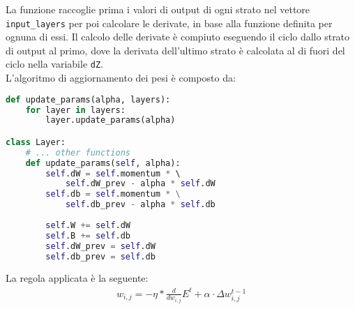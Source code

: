 La funzione raccoglie prima i valori di output di ogni strato nel vettore \texttt{input\_layers} per poi calcolare le derivate, in base alla funzione definita per ognuna di essi. Il calcolo delle derivate è compiuto eseguendo il ciclo dallo strato di output al primo, dove la derivata dell'ultimo strato è calcolata al di fuori del ciclo nella variabile \texttt{dZ}. \\
L'algoritmo di aggiornamento dei pesi è composto da:
\begin{lstlisting}[language=Python]
def update_params(alpha, layers):
    for layer in layers:
        layer.update_params(alpha)

class Layer:
    # ... other functions
    def update_params(self, alpha):
        self.dW = self.momentum * \ 
            self.dW_prev - alpha * self.dW
        self.db = self.momentum * \
            self.db_prev - alpha * self.db
        
        self.W += self.dW
        self.B += self.db
        self.dW_prev = self.dW
        self.db_prev = self.db
\end{lstlisting}
La regola applicata è la seguente:
\begin{align*}
w_{i,j} = - \eta * \frac{d}{dw_{i,j}}E^t + \alpha \cdot \Delta w_{i,j}^{t-1}
\end{align*}




